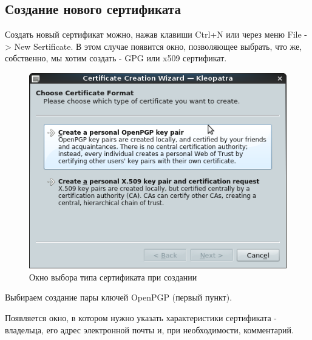 \documentclass[a4paper]{article}
\begin{document}
\subsection{Создание нового сертификата}

Создать новый сертификат можно, нажав клавиши Ctrl+N или через меню File -> New Sertificate. В этом случае появится окно, позволяющее выбрать, что же, собственно, мы хотим создать - GPG или x509 сертификат.

\begin{figure}[H]
	\begin{center}
		\includegraphics[scale=0.5]{pics/Screenshot at 2016-04-18 00:22:00.png}
		\caption{Окно выбора типа сертификата при создании} 
		\label{pic:pic_name} %
	\end{center}
\end{figure}

Выбираем создание пары ключей OpenPGP (первый пункт).

Появляется окно, в котором нужно указать характеристики сертификата - владельца, его адрес электронной почты и, при необходимости, комментарий.
\end{document}
